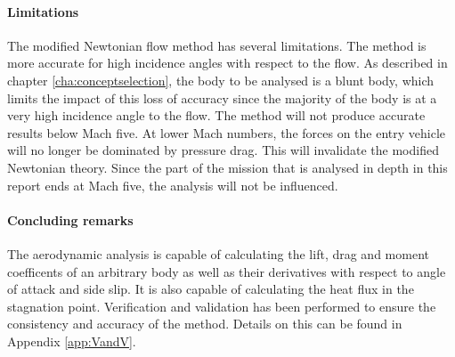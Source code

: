 \paragraph{Limitations}
The modified Newtonian flow method has several limitations. The method is more accurate for high incidence angles with respect to the flow.\cite{AndersonJr.2006} As described in chapter \ref{cha:conceptselection}, the body to be analysed is a blunt body, which limits the impact of this loss of accuracy since the majority of the body is at a very high incidence angle to the flow. The method will not produce accurate results below Mach five.\cite{AndersonJr.2006} At lower Mach numbers, the forces on the entry vehicle will no longer be dominated by  pressure drag. This will invalidate the modified Newtonian theory. Since the part of the mission that is analysed in depth in this report ends at Mach five, the analysis will not be influenced. 

\paragraph{Concluding remarks}
The aerodynamic analysis is capable of calculating the lift, drag and moment coefficents of an arbitrary body as well as their derivatives with respect to angle of attack and side slip. It is also capable of calculating the heat flux in the stagnation point. Verification and validation has been performed to ensure the consistency and accuracy of the method. Details on this can be found in Appendix \ref{app:VandV}.







